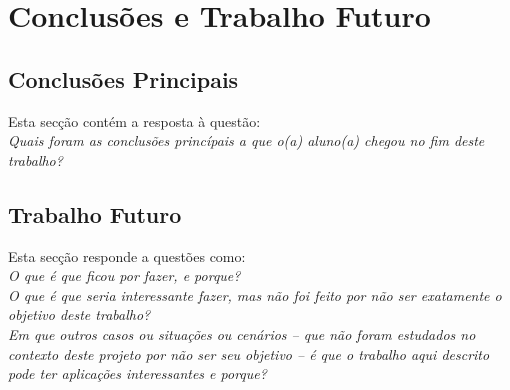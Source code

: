 \chapter{Conclusões e Trabalho Futuro}
\label{ch::conclusao}

\section{Conclusões Principais}
\label{sec::conclusao:principal}

Esta secção contém a resposta à questão: \\
\emph{Quais foram as conclusões princípais a que o(a) aluno(a) chegou no fim deste trabalho?}

\section{Trabalho Futuro}
\label{sec::conclusao:futuro}

Esta secção responde a questões como:\\
\emph{O que é que ficou por fazer, e porque?}\\
\emph{O que é que seria interessante fazer, mas não foi feito por não ser exatamente o objetivo deste trabalho?}\\
\emph{Em que outros casos ou situações ou cenários -- que não foram estudados no contexto deste projeto por não ser seu objetivo -- é que o trabalho aqui descrito pode ter aplicações interessantes e porque?}